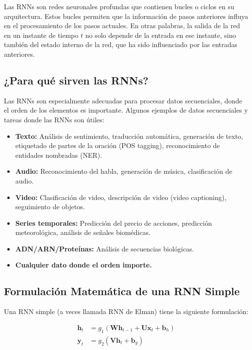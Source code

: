 \documentclass{article}
\begin{document}
Las RNNs son redes neuronales profundas que contienen bucles o ciclos en su arquitectura.  Estos bucles permiten que la información de pasos anteriores influya en el procesamiento de los pasos actuales.  En otras palabras, la salida de la red en un instante de tiempo \(t\) no solo depende de la entrada en ese instante, sino también del estado interno de la red, que ha sido influenciado por las entradas anteriores.

\subsection{¿Para qué sirven las RNNs?}

Las RNNs son especialmente adecuadas para procesar datos secuenciales, donde el orden de los elementos es importante.  Algunos ejemplos de datos secuenciales y tareas donde las RNNs son útiles:

\begin{itemize}
    \item \textbf{Texto:}  Análisis de sentimiento, traducción automática, generación de texto, etiquetado de partes de la oración (POS tagging), reconocimiento de entidades nombradas (NER).
    \item \textbf{Audio:}  Reconocimiento del habla, generación de música, clasificación de audio.
    \item \textbf{Video:}  Clasificación de video, descripción de video (video captioning), seguimiento de objetos.
    \item \textbf{Series temporales:}  Predicción del precio de acciones, predicción meteorológica, análisis de señales biomédicas.
    \item \textbf{ADN/ARN/Proteínas:} Análisis de secuencias biológicas.
    \item \textbf{Cualquier dato donde el orden importe.}
\end{itemize}

\subsection{Formulación Matemática de una RNN Simple}

Una RNN simple (a veces llamada RNN de Elman) tiene la siguiente formulación:

\begin{align*}
\mathbf{h}_t &= g_1(\mathbf{W}\mathbf{h}_{t-1} + \mathbf{U}\mathbf{x}_t + \mathbf{b}_h) \\
\mathbf{y}_t &= g_2(\mathbf{V}\mathbf{h}_t + \mathbf{b}_y)
\end{align*}
\end{document}
